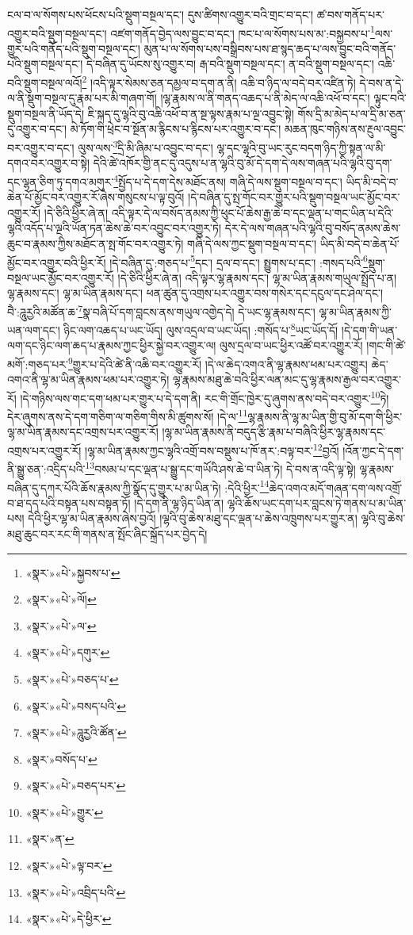 ངལ་བ་ལ་སོགས་པས་ཕོངས་པའི་སྡུག་བསྔལ་དང་། དུས་ཚིགས་འགྱུར་བའི་གྲང་བ་དང་། ཚ་བས་གནོད་པར་འགྱུར་བའི་སྡུག་བསྔལ་དང་། འཛག་གནོད་བྱེད་ལས་བྱུང་བ་དང་། ཁང་པ་ལ་སོགས་པས་མ་:བསྐྱབས་པ་\footnote{«སྣར་»«པེ་»སྐྱབས་པ་}ལས་གྱུར་པའི་གནོད་པའི་སྡུག་བསྔལ་དང་། མུན་པ་ལ་སོགས་པས་བསྒྲིབས་པས་ཐ་སྙད་ཆད་པ་ལས་བྱུང་བའི་གནོད་པའི་སྡུག་བསྔལ་དང་། དེ་བཞིན་དུ་ཡོངས་སུ་འགྱུར་བ། རྒ་བའི་སྡུག་བསྔལ་དང་། ན་བའི་སྡུག་བསྔལ་དང་། འཆི་བའི་སྡུག་བསྔལ་ལའོ།\footnote{«སྣར་»«པེ་»ལོ།} །འདི་ལྟར་སེམས་ཅན་དམྱལ་བ་དག་ན་ནི། འཆི་བ་ཉིད་ལ་བདེ་བར་འཛིན་ཏེ། དེ་བས་ན་དེ་ལ་ནི་སྡུག་བསྔལ་དུ་རྣམ་པར་མི་གཞག་གོ། །ལྷ་རྣམས་ལ་ནི་གནད་འཆད་པ་ནི་མེད་ལ་འཆི་འཕོ་བ་དང་། ལྟུང་བའི་སྡུག་བསྔལ་ནི་ཡོད་དེ། ཇི་སྐད་དུ་ལྷའི་བུ་འཆི་འཕོ་བ་ན་སྔ་ལྟས་རྣམ་པ་ལྔ་འབྱུང་སྟེ། གོས་དྲི་མ་མེད་པ་ལ་དྲི་མ་ཅན་དུ་འགྱུར་བ་དང་། མེ་ཏོག་གི་ཕྲེང་བ་སྔོན་མ་རྙིངས་པ་རྙིངས་པར་འགྱུར་བ་དང་། མཆན་ཁུང་གཉིས་ནས་རྔུལ་འབྱུང་བར་འགྱུར་བ་དང་། ལུས་ལས་\footnote{«སྣར་»«པེ་»ལ་}དྲི་མི་ཞིམ་པ་འབྱུང་བ་དང་། ལྷ་དང་ལྷའི་བུ་ཡང་རུང་བདག་ཉིད་ཀྱི་སྟན་ལ་མི་དགའ་བར་འགྱུར་བ་སྟེ། དེའི་ཚེ་འཁོར་གྱི་ནང་དུ་འདུས་པ་ན་ལྷའི་བུ་མོ་དེ་དག་དེ་ལས་གཞན་པའི་ལྷའི་བུ་དག་དང་ལྷན་ཅིག་ཏུ་དགའ་མགུར་\footnote{«སྣར་»«པེ་»དགུར་}སྤྱོད་པ་དེ་དག་དེས་མཐོང་ནས། གཞི་དེ་ལས་སྡུག་བསྔལ་བ་དང་། ཡིད་མི་བདེ་བ་ཆེན་པོ་མྱོང་བར་འགྱུར་རོ་ཞེས་གསུངས་པ་ལྟ་བུའོ། །དེ་བཞིན་དུ་སྤ་གོང་བར་གྱུར་པའི་སྡུག་བསྔལ་ཡང་མྱོང་བར་འགྱུར་རོ། །དེ་ཅིའི་ཕྱིར་ཞེ་ན། འདི་ལྟར་དེ་ལ་བསོད་ནམས་ཀྱི་ཕུང་པོ་ཆེས་རྒྱ་ཆེ་བ་དང་ལྡན་པ་གང་ཡིན་པ་དེའི་ལྷའི་འདོད་པ་ལྔའི་ཡོན་ཏན་ཆེས་ཆེ་བར་འབྱུང་བར་འགྱུར་ཏེ། དེར་དེ་ལས་གཞན་པའི་ལྷའི་བུ་བསོད་ནམས་ཆེས་ཆུང་བ་རྣམས་ཀྱིས་མཐོང་ན་སྤ་གོང་བར་འགྱུར་ཏེ། གཞི་དེ་ལས་ཀྱང་སྡུག་བསྔལ་བ་དང་། ཡིད་མི་བདེ་བ་ཆེན་པོ་མྱོང་བར་འགྱུར་བའི་ཕྱིར་རོ། །དེ་བཞིན་དུ་:གཅད་པ་\footnote{«སྣར་»«པེ་»བཅད་པ་}དང་། དྲལ་བ་དང་། སྤྱུགས་པ་དང་། :གསད་པའི་\footnote{«སྣར་»«པེ་»བསད་པའི་}སྡུག་བསྔལ་ཡང་མྱོང་བར་འགྱུར་རོ། །དེ་ཅིའི་ཕྱིར་ཞེ་ན། འདི་ལྟར་ལྷ་རྣམས་དང་། ལྷ་མ་ཡིན་རྣམས་གཡུལ་སྤྲོད་པ་ན། ལྷ་རྣམས་དང་། ལྷ་མ་ཡིན་རྣམས་དང་། ཕན་ཚུན་དུ་འགྲས་པར་འགྱུར་བས་གསེར་དང་དངུལ་དང་ཤེལ་དང་། བཻ་:ཌཱུརྱའི་མཚོན་ཆ་\footnote{«སྣར་»«པེ་»ཌཱུརྱའི་ཚོན་}སྣ་བཞི་པོ་དག་བླངས་ནས་གཡུལ་འགྱེད་དེ། དེ་ཡང་ལྷ་རྣམས་དང་། ལྷ་མ་ཡིན་རྣམས་ཀྱི་ཡན་ལག་དང་། ཉིང་ལག་འཆད་པ་ཡང་ཡོད། ལུས་འདྲལ་བ་ཡང་ཡོད། :གསོད་པ་\footnote{«སྣར་»བསོད་པ་}ཡང་ཡོད་དོ། །དེ་དག་གི་ཡན་ལག་དང་ཉིང་ལག་ཆད་པ་རྣམས་ཀྱང་ཕྱིར་སྐྱེ་བར་འགྱུར་ལ། ལུས་དྲལ་བ་ཡང་ཕྱིར་འཚོ་བར་འགྱུར་རོ། །གང་གི་ཚེ་མགོ་:གཅད་པར་\footnote{«སྣར་»«པེ་»བཅད་པར་}གྱུར་པ་དེའི་ཚེ་ནི་འཆི་བར་འགྱུར་རོ། །དེ་ལ་ཆེད་འགའ་ནི་ལྷ་རྣམས་ཕམ་པར་འགྱུར། ཆེད་འགའ་ནི་ལྷ་མ་ཡིན་རྣམས་ཕམ་པར་འགྱུར་ཏེ། ལྷ་རྣམས་མཐུ་ཆེ་བའི་ཕྱིར་ལན་མང་དུ་ལྷ་རྣམས་རྒྱལ་བར་འགྱུར་རོ། །དེ་གཉིས་ལས་གང་དག་ཕམ་པར་གྱུར་པ་དེ་དག་ནི། རང་གི་གྲོང་ཁྱེར་དུ་ཞུགས་ནས་བདེ་བར་འགྱུར་\footnote{«སྣར་»«པེ་»གྱུར་}ཏེ། དེར་ཞུགས་ནས་དེ་དག་གཅིག་ལ་གཅིག་གིས་མི་ཚུགས་སོ། །དེ་ལ་\footnote{«སྣར་»ན་}ལྷ་རྣམས་ནི་ལྷ་མ་ཡིན་གྱི་བུ་མོ་དག་གི་ཕྱིར་ལྷ་མ་ཡིན་རྣམས་དང་འགྲས་པར་འགྱུར་རོ། །ལྷ་མ་ཡིན་རྣམས་ནི་བདུད་རྩི་རྣམ་པ་བཞིའི་ཕྱིར་ལྷ་རྣམས་དང་འགྲས་པར་འགྱུར་རོ། །ལྷ་མ་ཡིན་རྣམས་ཀྱང་ལྷའི་འགྲོ་བས་བསྡུས་པ་ཁོ་ནར་:བལྟ་བར་\footnote{«སྣར་»«པེ་»ལྟ་བར་}བྱའོ། །འོན་ཀྱང་དེ་དག་ནི་སྒྱུ་ཅན་:འདྲིད་པའི་\footnote{«སྣར་»«པེ་»འབྲིད་པའི་}བསམ་པ་དང་ལྡན་པ་སྒྱུ་དང་གཡོའི་ཤས་ཆེ་བ་ཡིན་ཏེ། དེ་བས་ན་འདི་ལྟ་སྟེ། ལྷ་རྣམས་བཞིན་དུ་དཀར་པོའི་ཆོས་རྣམས་ཀྱི་སྣོད་དུ་གྱུར་པ་མ་ཡིན་ཏེ། :དེའི་ཕྱིར་\footnote{«སྣར་»«པེ་»དེ་ཕྱིར་}ཆེད་འགའ་མདོ་གཞན་དག་ལས་འགྲོ་བ་ཐ་དད་པའི་བསྟན་པས་བསྟན་ཏོ། །དེ་དག་ནི་ལྷ་ཉིད་ཡིན་ན། ལྷའི་ཆོས་ཡང་དག་པར་བླངས་ཏེ་གནས་པ་མ་ཡིན་པས། དེའི་ཕྱིར་ལྷ་མ་ཡིན་རྣམས་ཞེས་བྱའོ། །ལྷའི་བུ་ཆེས་མཐུ་དང་ལྡན་པ་ཆེས་འཁྲུགས་པར་གྱུར་ན། ལྷའི་བུ་ཆེས་མཐུ་ཆུང་བར་རང་གི་གནས་ན་སྤོང་ཞིང་སྐྲོད་པར་བྱེད་དེ། 